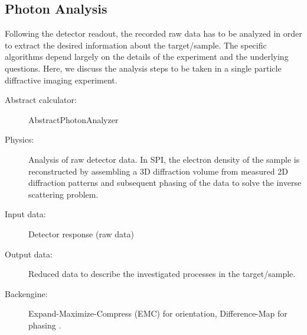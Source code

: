 \documentclass[12pt]{scrartcl}
\begin{document}
\subsection{Photon Analysis}
Following the detector readout, the recorded raw data has to be analyzed in
order to extract the desired information about the target/sample. The specific
algorithms depend largely on the details of the experiment and the underlying
questions. Here, we discuss the analysis steps to be taken in a single particle
diffractive imaging experiment.
\begin{description}
  \item[Abstract calculator:] AbstractPhotonAnalyzer
  \item[Physics:]  Analysis of raw detector data. In SPI, the electron density
    of the sample is reconstructed by assembling a 3D diffraction volume
    from measured 2D diffraction patterns and subsequent phasing of the data to
    solve the inverse scattering problem.
  \item[Input data:] Detector response (raw data)
  \item[Output data:] Reduced data to describe the investigated processes in the target/sample.
  \item[Backengine:] Expand-Maximize-Compress (EMC)  for orientation,
    Difference-Map for phasing \cite{Loh2009, s2e_recon_bitbucket}.
\end{description}

\printbibliography
\end{document}
